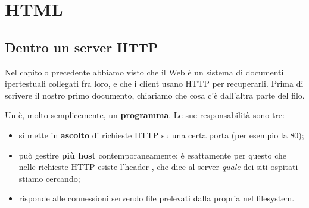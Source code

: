 \chapter{HTML}

\section{Dentro un server HTTP}

Nel capitolo precedente abbiamo visto che il Web è un sistema di documenti
ipertestuali collegati fra loro, e che i client usano HTTP per recuperarli.
Prima di scrivere il nostro primo documento, chiariamo che cosa c'è dall'altra
parte del filo.

Un  è, molto semplicemente, un \textbf{programma}. Le sue
responsabilità sono tre:

\begin{itemize}
  \item si mette in \textbf{ascolto} di richieste HTTP su una certa porta (per
        esempio la 80);
  \item può gestire \textbf{più host} contemporaneamente: è esattamente per
        questo che nelle richieste HTTP esiste l'header , che dice al
        server \textit{quale} dei siti ospitati stiamo cercando;
  \item risponde alle connessioni servendo file prelevati dalla propria
         nel filesystem.
\end{itemize}

